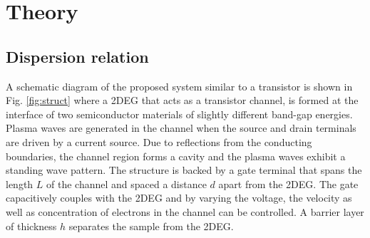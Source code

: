 \documentclass[11pt]{article}
\begin{document}
\section{Theory}
\subsection{Dispersion relation}
%
A schematic diagram of the proposed system similar to a transistor is shown in Fig. \ref{fig:struct} where a 2DEG that acts as a transistor channel, is formed at the interface of two semiconductor materials of slightly different band-gap energies. Plasma waves are generated in the channel when the source and drain terminals are driven by a current source. Due to reflections from the conducting boundaries, the channel region forms a cavity and the plasma waves exhibit a standing wave pattern. The structure is backed by a gate terminal that spans the length $L$ of the channel and spaced a distance $d$ apart from the 2DEG. The gate capacitively couples with the 2DEG and by varying the voltage, the velocity as well as concentration of electrons in the channel can be controlled. A barrier layer of thickness $h$ separates the sample from the 2DEG.
\end{document}
